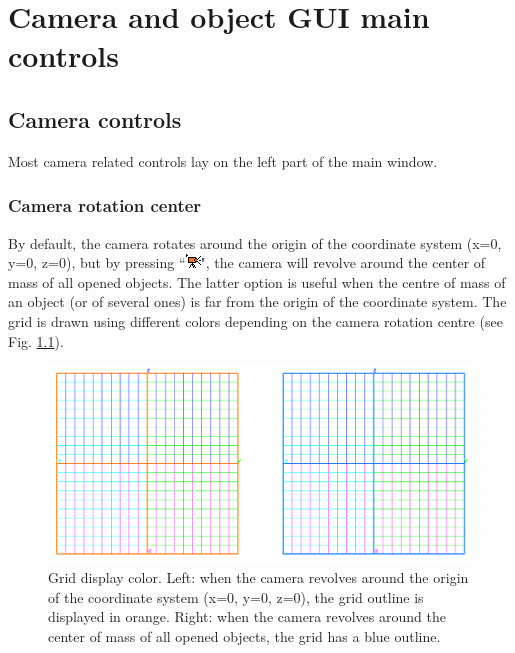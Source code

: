 \chapter{Camera and object GUI main controls}
\minitoc  


 \section{Camera controls}
Most camera related controls lay on the left part of the main window.
\subsection{Camera rotation center}
By default, the camera rotates around the origin of the coordinate system (x=0, y=0, z=0), but by pressing ``\includegraphics[scale=0.7]{images/06/camera/move_cam.png}", the camera will revolve around the center of mass of all opened objects. The latter option is useful when the centre of mass of an object (or of several ones) is far from the origin of the coordinate system. The grid is drawn using different colors depending on the camera rotation centre (see Fig. \ref{grid_color}). %

\begin{figure}
  \centering
  \includegraphics[scale=0.4]{images/06/camera/grids.png} 
	\caption{Grid display color. Left: when the camera revolves around the origin of the coordinate system (x=0, y=0, z=0), the grid outline is displayed in orange. Right: when the camera revolves around the center of mass of all opened objects, the grid has a blue outline.}
\label{grid_color}
 
\end{figure}

